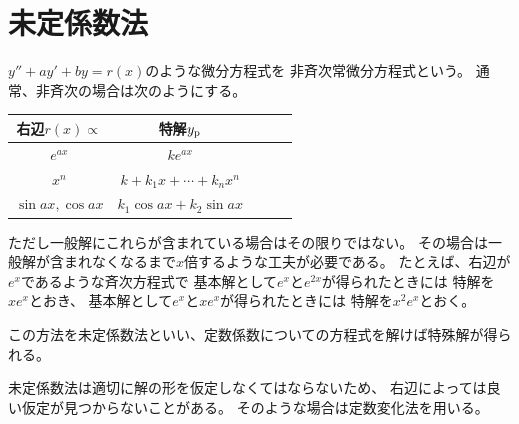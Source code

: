 \newpage
\section{未定係数法}
$y''+ay'+by=r(x)$のような微分方程式を
非斉次常微分方程式という。
通常、非斉次の場合は次のようにする。

\begin{table}[H]
\centering
\begin{tabular}{ccccc}
\toprule
  右辺$r(x)\propto$ & 特解$y_{\rm{p}}$ \\
\midrule
  $e^{ax}$ & $k e^{ax}$ \\
  $x^n$ & $k + k_1 x + \cdots + k_n x^n$ \\
  $\sin{ax},\cos{ax}$ & $k_1 \cos{ax} + k_2 \sin{ax}$ \\
\bottomrule
\end{tabular}\end{table}

ただし一般解にこれらが含まれている場合はその限りではない。
その場合は一般解が含まれなくなるまで$x$倍するような工夫が必要である。
たとえば、右辺が$e^x$であるような斉次方程式で
基本解として$e^x$と$e^{2x}$が得られたときには
特解を$xe^x$とおき、
基本解として$e^x$と$xe^{x}$が得られたときには
特解を$x^2e^x$とおく。

この方法を未定係数法といい、定数係数についての方程式を解けば特殊解が得られる。

未定係数法は適切に解の形を仮定しなくてはならないため、
右辺によっては良い仮定が見つからないことがある。
そのような場合は定数変化法を用いる。
